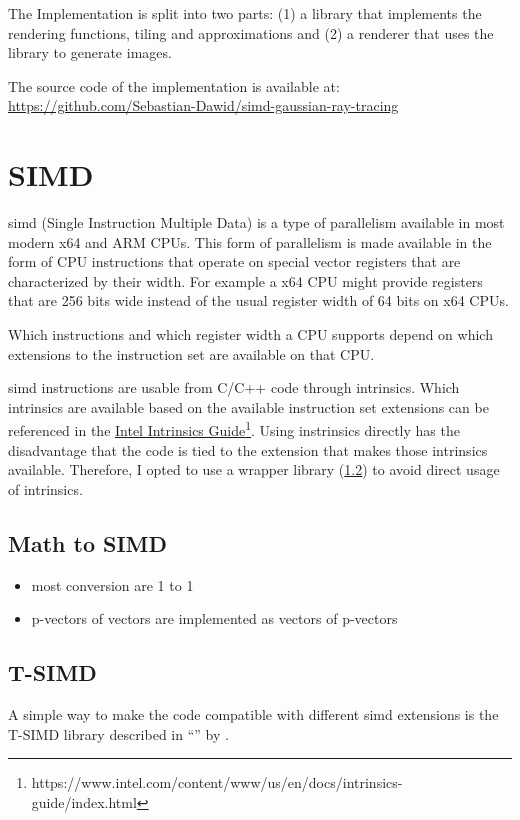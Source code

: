 \documentclass[a4paper, 11pt]{memoir}
\begin{document}
    The Implementation is split into two parts: (1) a library that implements the rendering functions, tiling and approximations and (2) a renderer that uses the library to generate images.

    The source code of the implementation is available at: \href{https://github.com/Sebastian-Dawid/simd-gaussian-ray-tracing}{https://github.com/Sebastian-Dawid/simd-gaussian-ray-tracing}

    \section{SIMD}
    \label{sec:simd}
    \gls{simd} (Single Instruction Multiple Data) is a type of parallelism available in most modern x64 and ARM CPUs. This form of parallelism is made available in the form of CPU instructions
    that operate on special vector registers that are characterized by their width. For example a x64 CPU might provide registers that are 256 bits wide instead of the usual
    register width of 64 bits on x64 CPUs.
    
    Which instructions and which register width a CPU supports depend on which extensions to the instruction set are available on that CPU.

    \gls{simd} instructions are usable from C/C++ code through intrinsics. Which intrinsics are available based on the available instruction set extensions
    can be referenced in the \href{https://www.intel.com/content/www/us/en/docs/intrinsics-guide/index.html}{Intel Intrinsics Guide}\footnote{https://www.intel.com/content/www/us/en/docs/intrinsics-guide/index.html}.
    Using instrinsics directly has the disadvantage that the code is tied to the extension that makes those intrinsics available. Therefore, I opted to use a wrapper library (\ref{sec:tsimd})
    to avoid direct usage of intrinsics.

    \subsection{Math to SIMD}
    \begin{itemize}
        \item most conversion are 1 to 1
        \item p-vectors of vectors are implemented as vectors of p-vectors
    \end{itemize}
    \subsection{T-SIMD}
    \label{sec:tsimd}
    A simple way to make the code compatible with different \gls{simd} extensions is the T-SIMD library described in \enquote{} \cite{own_moeller_16_2} by \citeauthor{own_moeller_16_2}.
\end{document}

